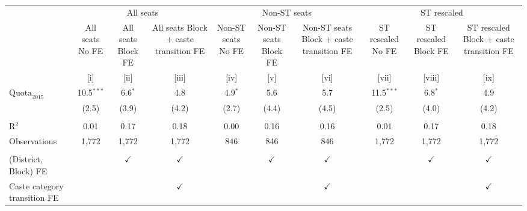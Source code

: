 
\begingroup
\centering
\scriptsize
\begin{adjustbox}{max width=\linewidth}
   \begin{threeparttable}[b]
      \begin{tabular}{lccccccccc}
         \toprule
          & \multicolumn{3}{c}{All seats} & \multicolumn{3}{c}{Non-ST seats} & \multicolumn{3}{c}{ST rescaled} \\
                                      & All seats No FE & All seats Block FE & All seats Block + caste transition FE & Non-ST seats No FE & Non-ST seats Block FE & Non-ST seats Block + caste transition FE & ST rescaled No FE & ST rescaled Block FE & ST rescaled Block + caste transition FE \\
                                      & [i]             & [ii]               & [iii]                                 & [iv]               & [v]                   & [vi]                                     & [vii]             & [viii]               & [ix]\\
         \midrule
         $\text{Quota}_{2015}$        & 10.5$^{***}$    & 6.6$^{*}$          & 4.8                                   & 4.9$^{*}$          & 5.6                   & 5.7                                      & 11.5$^{***}$      & 6.8$^{*}$            & 4.9\\
                                      & (2.5)           & (3.9)              & (4.2)                                 & (2.7)              & (4.4)                 & (4.5)                                    & (2.5)             & (4.0)                & (4.2)\\
          \\
         R$^2$                        & 0.01            & 0.17               & 0.18                                  & 0.00               & 0.16                  & 0.16                                     & 0.01              & 0.17                 & 0.18\\
         Observations                 & 1,772           & 1,772              & 1,772                                 & 846                & 846                   & 846                                      & 1,772             & 1,772                & 1,772\\
          \\
         (District, Block) FE         &                 & $\checkmark$       & $\checkmark$                          &                    & $\checkmark$          & $\checkmark$                             &                   & $\checkmark$         & $\checkmark$\\
         Caste category transition FE &                 &                    & $\checkmark$                          &                    &                       & $\checkmark$                             &                   &                      & $\checkmark$\\
         \bottomrule
      \end{tabular}


\end{threeparttable}
\end{adjustbox}
